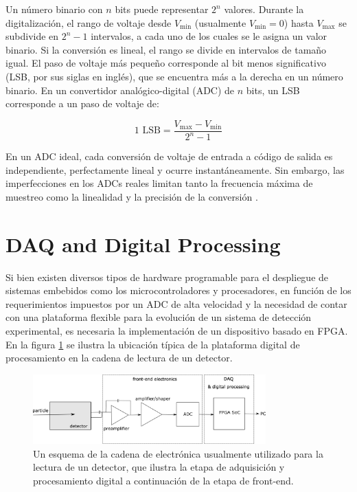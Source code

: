 \documentclass[]{book}
\begin{document}
\noindent Un número binario con $n$ bits puede representar $2^{n}$ valores. Durante la digitalización, el rango de voltaje desde $V_{\text{min}}$ (usualmente $V_{\text{min}} = 0$) hasta $V_{\text{max}}$ se subdivide en $2^{n} - 1$ intervalos, a cada uno de los cuales se le asigna un valor binario. Si la conversión es lineal, el rango se divide en intervalos de tamaño igual. El paso de voltaje más pequeño corresponde al bit menos significativo (LSB, por sus siglas en inglés), que se encuentra más a la derecha en un número binario. En un convertidor analógico-digital (ADC) de $n$ bits, un LSB corresponde a un paso de voltaje de:

$$
1 \text{ LSB} = \frac{V_{\text{max}} - V_{\text{min}}}{2^n - 1}
$$

\noindent En un ADC ideal, cada conversión de voltaje de entrada a código de salida es independiente, perfectamente lineal y ocurre instantáneamente. Sin embargo, las imperfecciones en los ADCs reales limitan tanto la frecuencia máxima de muestreo como la linealidad y la precisión de la conversión \cite{kolanoski2020particle}. 


\section{DAQ and Digital Processing}

\noindent Si bien existen diversos tipos de hardware programable para el despliegue de sistemas embebidos como los microcontroladores y procesadores, en función de los requerimientos impuestos por un ADC de alta velocidad y la necesidad de contar con una plataforma flexible para la evolución de un sistema de detección experimental, es necesaria la implementación de un dispositivo basado en FPGA. En la figura \ref{fig:pulse_chain} se ilustra la ubicación típica de la plataforma digital de procesamiento en la cadena de lectura de un detector.
\begin{figure}[h]
    \centering
    \includegraphics[width=0.8\textwidth]{pulse_chain_generic.png}
    \caption{Un esquema de la cadena de electrónica usualmente utilizado para la lectura de un
    detector, que ilustra la etapa de adquisición y procesamiento digital a continuación de la etapa de front-end.}
    \label{fig:pulse_chain}

\end{figure}
\end{document}
